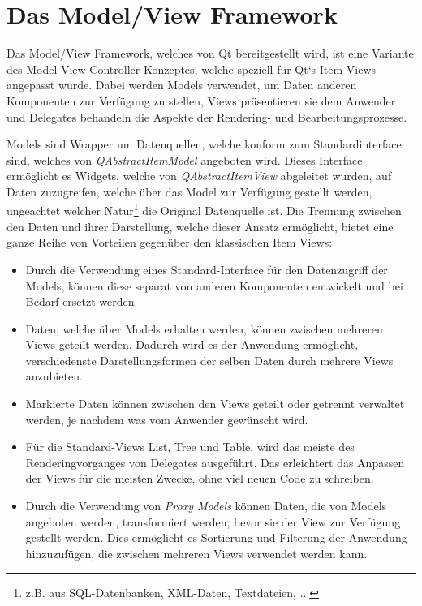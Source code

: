 \documentclass[11pt,a4paper,titlepage]{scrreprt}
\begin{document}
\section{Das Model/View Framework}
Das Model/View Framework, welches von Qt bereitgestellt wird, ist eine Variante des
Model-View-Controller-Konzeptes, welche speziell für Qt`s Item Views angepasst wurde.
Dabei werden Models verwendet, um Daten anderen Komponenten zur Verfügung zu stellen,
Views präsentieren sie dem Anwender und Delegates behandeln die Aspekte der
Rendering- und Bearbeitungsprozesse.

Models sind Wrapper um Datenquellen, welche konform zum Standardinterface sind, welches
von {\itshape QAbstractItemModel} angeboten wird. Dieses Interface ermöglicht es Widgets,
welche von {\itshape QAbstractItemView} abgeleitet wurden, auf Daten zuzugreifen, welche 
über das Model zur Verfügung gestellt werden, ungeachtet welcher Natur\footnote{z.B.
aus SQL-Datenbanken, XML-Daten, Textdateien, ...} die Original Datenquelle ist.
Die Trennung zwischen den Daten und ihrer Darstellung, welche dieser Ansatz ermöglicht,
bietet eine ganze Reihe von Vorteilen gegenüber den klassischen Item Views:
\begin{itemize}
\item Durch die Verwendung eines Standard-Interface für den Datenzugriff der Models,
können diese separat von anderen Komponenten entwickelt und bei Bedarf ersetzt werden.
\item Daten, welche über Models erhalten werden, können zwischen mehreren Views geteilt werden.
Dadurch wird es der Anwendung ermöglicht, verschiedenste Darstellungsformen der selben Daten
durch mehrere Views anzubieten.
\item Markierte Daten können zwischen den Views geteilt oder getrennt verwaltet werden, je
nachdem was vom Anwender gewünscht wird.
\item Für die Standard-Views List, Tree und Table, wird das meiste des Renderingvorganges von
Delegates ausgeführt. Das erleichtert das Anpassen der Views für die meisten Zwecke, ohne
viel neuen Code zu schreiben.
\item Durch die Verwendung von {\itshape Proxy Models} können Daten, die von Models angeboten
werden, transformiert werden, bevor sie der View zur Verfügung gestellt werden. Dies ermöglicht
es Sortierung und Filterung der Anwendung hinzuzufügen, die zwischen mehreren Views verwendet
werden kann.
\end{itemize}
\end{document}
